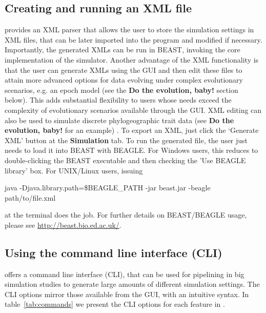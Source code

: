 \subsection{Creating and running an XML file}

{\bussname} provides an XML parser that allows the user to store the simulation settings in XML files, that can be later imported into the program and modified if necessary. Importantly, the generated XMLs can be run in BEAST, invoking the core implementation of the simulator.
Another advantage of the XML functionality is that the user can generate XMLs using the GUI and then edit these files to attain more advanced options for data evolving under complex evolutionary scenarios, e.g. an epoch model (see the \textbf{Do the evolution, baby!} section below).
This adds substantial flexibility to users whose needs exceed the complexity of evolutionary scenarios available through the GUI.
XML editing can also be used to simulate discrete phylogeographic trait data (see \textbf{Do the evolution, baby!} for an example) .
To export an XML, just click the `Generate XML' button at the \textbf{Simulation} tab.
To run the generated file, the user just needs to load it into BEAST with BEAGLE. For Windows users, this reduces to double-clicking the BEAST executable and then checking the 'Use BEAGLE library' box. For UNIX/Linux users, issuing 

\begin{code}
java -Djava.library.path=\$BEAGLE\_PATH -jar beast.jar -beagle path/to/file.xml
\end{code}

\noindent
at the terminal does the job.
For further details on BEAST/BEAGLE usage, please see \url{http://beast.bio.ed.ac.uk/}.


\subsection{Using the command line interface (CLI)}

{\bussname} offers a command line interface (CLI), that can be used for pipelining in big simulation studies to generate large amounts of different simulation settings.
The CLI options mirror those available from the GUI, with an intuitive syntax.
In table~\ref{tab:commands} we present the CLI options for each feature in {\bussname}.

